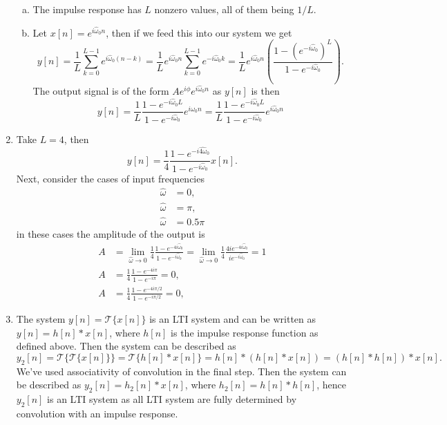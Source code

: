 \begin{enumerate}
\begin{enumerate}[a)]
\item The impulse response has $L$ nonzero values, all of them being $1/L$. 

\item Let $x[n]=e^{i\hat{\omega}_{0}n}$, then if we feed this into our system we get
$$y[n]=\frac{1}{L}\sum_{k=0}^{L-1}e^{i\hat{\omega}_{0}(n-k)}=\frac{1}{L}e^{i\hat{\omega}_{0}n}\sum_{k=0}^{L-1}e^{-i\hat{\omega}_{0}k}=\frac{1}{L}e^{i\hat{\omega}_{0}n}\left(\frac{1-(e^{-i\hat{\omega}_{0}})^{L}}{1-e^{-i\hat{\omega}_{0}}}\right).$$
The output signal is of the form $Ae^{i\phi}e^{i\hat{\omega}_{0}n}$ as $y[n]$ is then
$$y[n]=\frac{1}{L}\frac{1-e^{-i\hat{\omega}_{0}L}}{1-e^{-i\hat{\omega}_{0}}}e^{i\hat{\omega}_{0}n}=\frac{1}{L}\frac{1-e^{-i\hat{\omega}_{0}L}}{1-e^{-i\hat{\omega}_{0}}}e^{i\hat{\omega}_{0}n}$$
\end{enumerate}

\item Take $L=4$, then
$$y[n]=\frac{1}{4}\frac{1-e^{-i\hat{4\omega}_{0}}}{1-e^{-i\hat{\omega}_{0}}}x[n].$$
Next, consider the cases of input frequencies
\begin{align*}
    \hat{\omega}&=0,\\
    \hat{\omega}&=\pi,\\
    \hat{\omega}&=0.5\pi
\end{align*}
in these cases the amplitude of the output is
\begin{align*}
    A&=\lim_{\hat{\omega}\to 0}\frac{1}{4}\frac{1-e^{-4i\hat{\omega}_{0}}}{1-e^{-i\hat{\omega}_{0}}}=\lim_{\hat{\omega}\to 0}\frac{1}{4}\frac{4ie^{-4i\hat{\omega}_{0}}}{ie^{-i\hat{\omega}_{0}}}=1 \\
    A&=\frac{1}{4}\frac{1-e^{-4i\pi}}{1-e^{-i\pi}}=0,\\
    A&=\frac{1}{4}\frac{1-e^{-4i\pi/2}}{1-e^{-i\pi/2}}=0,
\end{align*}

\item The system $y[n]=\mathcal{T}\{x[n]\}$ is an LTI system and can be written as $y[n]=h[n]*x[n]$, where $h[n]$ is the impulse response function as defined above. Then the system can be described as
$$y_{2}[n]=\mathcal{T}\{\mathcal{T}\{x[n]\}\}=\mathcal{T}\{h[n]*x[n]\}=h[n]*(h[n]*x[n])=(h[n]*h[n])*x[n].$$
We've used associativity of convolution in the final step. Then the system can be described as $y_{2}[n]=h_{2}[n]*x[n]$, where $h_{2}[n]=h[n]*h[n]$, hence $y_{2}[n]$ is an LTI system as all LTI system are fully determined by convolution with an impulse response. 


\end{enumerate}
